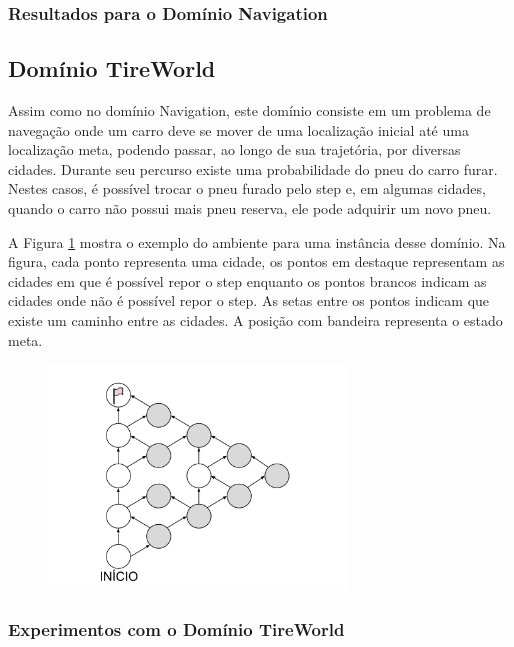 \documentclass[12pt,a4paper]{article}
\begin{document}
%


\subsubsection{Resultados para o Domínio Navigation}\label{resulsNavigation}





\subsection{Domínio TireWorld}\label{tireworld}

Assim como no domínio Navigation, este domínio consiste em um problema de navegação onde um carro deve se mover de uma localização inicial até uma localização meta, podendo passar, ao longo de sua trajetória, por diversas cidades. Durante seu percurso existe uma probabilidade do pneu do carro furar. Nestes casos, é possível trocar o pneu furado pelo step e, em algumas cidades, quando o carro não possui mais pneu reserva, ele pode adquirir um novo pneu.

A Figura \ref{fig:tireworld} mostra o exemplo do ambiente para  uma instância desse domínio. Na figura, cada ponto representa uma cidade, os pontos em destaque representam as cidades em que é possível repor o step enquanto os pontos brancos indicam as cidades onde não é possível repor o step. As setas entre os pontos indicam que existe um caminho entre as cidades. A posição com bandeira representa o estado meta. 

\begin{figure}[H]%
  \centering
  \includegraphics[width=8cm]{figures/tireworld.png}
  \caption{}
  \label{fig:tireworld}
\end{figure}


\subsubsection{Experimentos com o Domínio TireWorld}
\label{experimentosTireworld}
\end{document}
